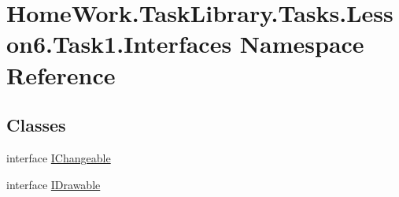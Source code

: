 \hypertarget{namespace_home_work_1_1_task_library_1_1_tasks_1_1_lesson6_1_1_task1_1_1_interfaces}{}\section{Home\+Work.\+Task\+Library.\+Tasks.\+Lesson6.\+Task1.\+Interfaces Namespace Reference}
\label{namespace_home_work_1_1_task_library_1_1_tasks_1_1_lesson6_1_1_task1_1_1_interfaces}
\subsection*{Classes}
\begin{DoxyCompactItemize}
\item 
interface \mbox{\hyperlink{interface_home_work_1_1_task_library_1_1_tasks_1_1_lesson6_1_1_task1_1_1_interfaces_1_1_i_changeable}{I\+Changeable}}
\item 
interface \mbox{\hyperlink{interface_home_work_1_1_task_library_1_1_tasks_1_1_lesson6_1_1_task1_1_1_interfaces_1_1_i_drawable}{I\+Drawable}}
\end{DoxyCompactItemize}
